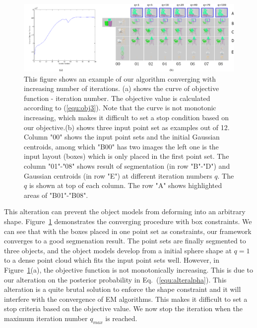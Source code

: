 \begin{figure}
	\centering
	\includegraphics[width=\linewidth]{images/Initialization/iters_merge}
	\caption{\label{fig:iter} This figure shows an example of our algorithm converging with increasing number of iterations.
		(a) shows the curve of objective function - iteration number. The objective value is calculated according to (\ref{equ:obj3}). Note that the curve is not monotonic increasing, which makes it difficult to set a stop condition based on our objective.(b) shows three input point set as examples out of 12. Column "00" shows the input point sets and the initial Gaussian centroids, among which "B00" has two images the left one  is the input layout (boxes) which is only placed in the first point set. The column "01"-"08" shows result of segmentation (in row "B"-"D") and Gaussian centroids (in row "E") at different iteration numbers $q$. The $q$ is shown at top of each column. The row "A" shows highlighted areas of "B01"-"B08". }
\end{figure}

This alteration can prevent the object models from deforming into an arbitrary shape.
%
%
Figure~\ref{fig:iter} demonstrates the converging procedure with box constraints. 
%
We can see that with the boxes placed in one point set as constraints, our framework converges to a good segmenation result. The point sets are finally segmented to three objects, and the object models develop from a initial sphere shape at $q=1$ to a dense point cloud which fits the input point sets well. 
%
However, in Figure~\ref{fig:iter}(a), the objective function is not monotonically increasing. 
This is due to our alteration on the posterior probability in Eq.~(\ref{equ:alteralpha}). This alteration is a quite brutal solution to enforce the shape constraint and it will interfere with the convergence of EM algorithms.
% 
This makes it difficult to set a stop criteria based on the objective value. 
We now stop the iteration when the maximum iteration number $q_{max}$ is reached.
 

